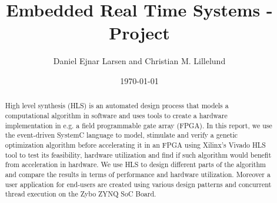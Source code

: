 \documentclass{article}
\title{Embedded Real Time Systems - Project}
\author{Daniel Ejnar Larsen and Christian M. Lillelund}
\date{\today}
\begin{document}
\maketitle
\begin{abstract}
	High level synthesis (HLS) is an automated design process that models a computational algorithm in software and uses tools to create a hardware implementation in e.g. a field programmable gate array (FPGA). In this report, we use the event-driven SystemC language to model, stimulate and verify a genetic optimization algorithm before accelerating it in an FPGA using Xilinx's Vivado HLS tool to test its feasibility, hardware utilization and find if such algorithm would benefit from acceleration in hardware. We use HLS to design different parts of the algorithm and compare the results in terms of performance and hardware utilization. Moreover a user application for end-users are created using various design patterns and concurrent thread execution on the Zybo ZYNQ SoC Board. 
\end{abstract}






















\appendix


\end{document}

